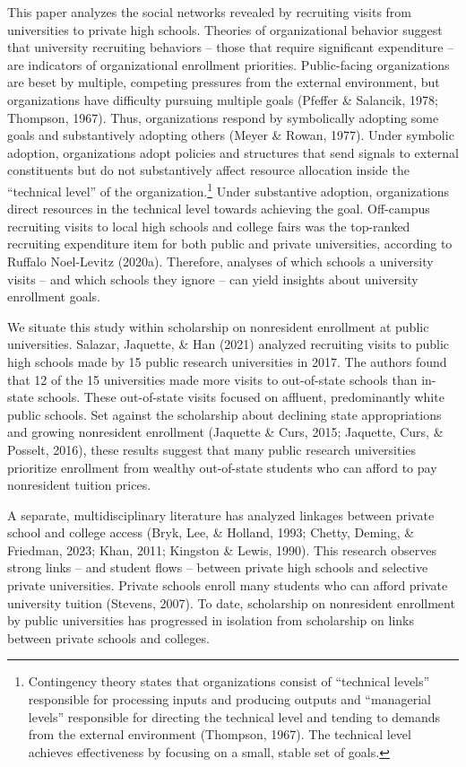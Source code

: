 \documentclass[
  12pt,
]{article}
\begin{document}
This paper analyzes the social networks revealed by recruiting visits from universities to private high schools. Theories of organizational behavior suggest that university recruiting behaviors -- those that require significant expenditure -- are indicators of organizational enrollment priorities. Public-facing organizations are beset by multiple, competing pressures from the external environment, but organizations have difficulty pursuing multiple goals (Pfeffer \& Salancik, 1978; Thompson, 1967). Thus, organizations respond by symbolically adopting some goals and substantively adopting others (Meyer \& Rowan, 1977). Under symbolic adoption, organizations adopt policies and structures that send signals to external constituents but do not substantively affect resource allocation inside the ``technical level'' of the organization.\footnote{Contingency theory states that organizations consist of ``technical levels'' responsible for processing inputs and producing outputs and ``managerial levels'' responsible for directing the technical level and tending to demands from the external environment (Thompson, 1967). The technical level achieves effectiveness by focusing on a small, stable set of goals.} Under substantive adoption, organizations direct resources in the technical level towards achieving the goal. Off-campus recruiting visits to local high schools and college fairs was the top-ranked recruiting expenditure item for both public and private universities, according to Ruffalo Noel-Levitz (2020a). Therefore, analyses of which schools a university visits -- and which schools they ignore -- can yield insights about university enrollment goals.

We situate this study within scholarship on nonresident enrollment at public universities. Salazar, Jaquette, \& Han (2021) analyzed recruiting visits to public high schools made by 15 public research universities in 2017. The authors found that 12 of the 15 universities made more visits to out-of-state schools than in-state schools. These out-of-state visits focused on affluent, predominantly white public schools. Set against the scholarship about declining state appropriations and growing nonresident enrollment (Jaquette \& Curs, 2015; Jaquette, Curs, \& Posselt, 2016), these results suggest that many public research universities prioritize enrollment from wealthy out-of-state students who can afford to pay nonresident tuition prices.

A separate, multidisciplinary literature has analyzed linkages between private school and college access (Bryk, Lee, \& Holland, 1993; Chetty, Deming, \& Friedman, 2023; Khan, 2011; Kingston \& Lewis, 1990). This research observes strong links -- and student flows -- between private high schools and selective private universities. Private schools enroll many students who can afford private university tuition (Stevens, 2007). To date, scholarship on nonresident enrollment by public universities has progressed in isolation from scholarship on links between private schools and colleges.
\end{document}
